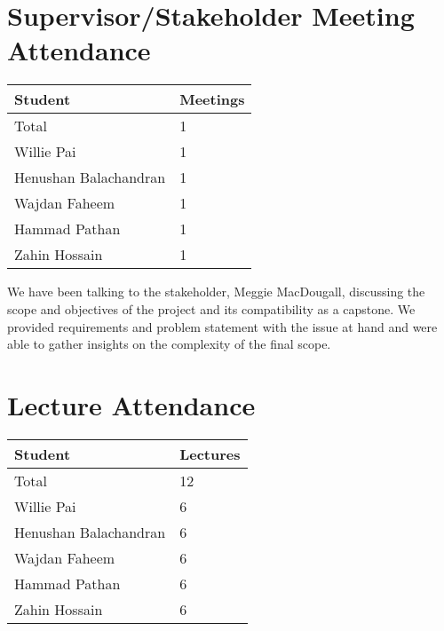 \documentclass{article}
\begin{document}
\section{Supervisor/Stakeholder Meeting Attendance}


\begin{table}[H]
\centering
\begin{tabular}{ll}
\toprule
\textbf{Student} & \textbf{Meetings}\\
\midrule
Total & 1\\
Willie Pai & 1\\
Henushan Balachandran & 1\\
Wajdan Faheem & 1\\
Hammad Pathan & 1\\
Zahin Hossain & 1\\
\bottomrule
\end{tabular}
\end{table}

We have been talking to the stakeholder, Meggie MacDougall, discussing the scope and objectives of the project and its compatibility as a capstone. We provided requirements and problem statement with the issue at hand and were able to gather insights on the complexity of the final scope.

\section{Lecture Attendance}


\begin{table}[H]
\centering
\begin{tabular}{ll}
\toprule
\textbf{Student} & \textbf{Lectures}\\
\midrule
Total & 12\\
Willie Pai & 6\\
Henushan Balachandran & 6\\
Wajdan Faheem & 6\\
Hammad Pathan & 6\\
Zahin Hossain & 6\\
\bottomrule
\end{tabular}
\end{table}
\end{document}
